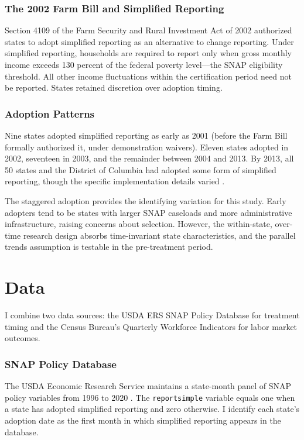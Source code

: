 \documentclass[12pt]{article}
\begin{document}
\subsubsection*{The 2002 Farm Bill and Simplified Reporting} Section 4109 of the Farm Security and Rural Investment Act of 2002 authorized states to adopt simplified reporting as an alternative to change reporting. Under simplified reporting, households are required to report only when gross monthly income exceeds 130 percent of the federal poverty level---the SNAP eligibility threshold. All other income fluctuations within the certification period need not be reported. States retained discretion over adoption timing.

\subsubsection*{Adoption Patterns} Nine states adopted simplified reporting as early as 2001 (before the Farm Bill formally authorized it, under demonstration waivers). Eleven states adopted in 2002, seventeen in 2003, and the remainder between 2004 and 2013. By 2013, all 50 states and the District of Columbia had adopted some form of simplified reporting, though the specific implementation details varied \citep{usda_snap_policy}.

The staggered adoption provides the identifying variation for this study. Early adopters tend to be states with larger SNAP caseloads and more administrative infrastructure, raising concerns about selection. However, the within-state, over-time research design absorbs time-invariant state characteristics, and the parallel trends assumption is testable in the pre-treatment period.

\section{Data}

I combine two data sources: the USDA ERS SNAP Policy Database for treatment timing and the Census Bureau's Quarterly Workforce Indicators for labor market outcomes.

\subsubsection*{SNAP Policy Database} The USDA Economic Research Service maintains a state-month panel of SNAP policy variables from 1996 to 2020 \citep{usda_snap_policy}. The \texttt{reportsimple} variable equals one when a state has adopted simplified reporting and zero otherwise. I identify each state's adoption date as the first month in which simplified reporting appears in the database.
\end{document}
